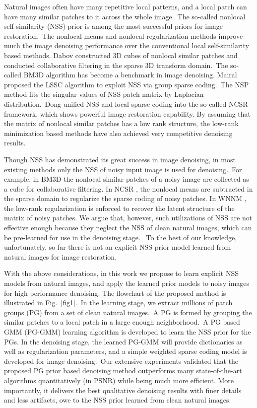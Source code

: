 Natural images often have many repetitive local patterns, and a local patch can have many similar patches to it across the whole image.\ The so-called nonlocal self-similarity (NSS) prior is among the most successful priors for image restoration.\ The nonlocal means \cite{nlm} and nonlocal regularization \cite{nlr} methods improve much the image denoising performance over the conventional local self-similarity based methods. Dabov \etal \cite{bm3d} constructed 3D cubes of nonlocal similar patches and conducted collaborative filtering in the sparse 3D transform domain.\ The so-called BM3D algorithm has become a benchmark in image denoising. Mairal \etal \cite{lssc} proposed the LSSC algorithm to exploit NSS via group sparse coding.\ The NSP \cite{nsp} method fits the singular values of NSS patch matrix by Laplacian distribution.\ Dong \etal \cite{ncsr} unified NSS and local sparse coding into the so-called NCSR framework, which shows powerful image restoration capability. By assuming that the matrix of nonlocal similar patches has a low rank structure, the low-rank minimization based methods \cite{nnm,wnnm} have also achieved very competitive denoising results. 

Though NSS has demonstrated its great success in image denoising, in most existing methods only the NSS of noisy input image is used for denoising.\ For example, in BM3D \cite{bm3d} the nonlocal similar patches of a noisy image are collected as a cube for collaborative filtering. In NCSR \cite{ncsr}, the nonlocal means are subtracted in the sparse domain to regularize the sparse coding of noisy patches. In WNNM \cite{wnnm}, the low-rank regularization is enforced to recover the latent structure of the matrix of noisy patches. We argue that, however, such utilizations of NSS are not effective enough because they neglect the NSS of clean natural images, which can be pre-learned for use in the denoising stage. \ To the best of our knowledge, unfortunately, so far there is not an explicit NSS prior model learned from natural images for image restoration. 

With the above considerations, in this work we propose to learn explicit NSS models from natural images, and apply the learned prior models to noisy images for high performance denoising. The flowchart of the proposed method is illustrated in Fig.\ \ref{fig1}.\ In the learning stage, we extract millions of patch groups (PG) from a set of clean natural images.\ A PG is formed by grouping the similar patches to a local patch in a large enough neighborhood.\ A PG based GMM (PG-GMM) learning algorithm is developed to learn the NSS prior for the PGs. In the denoising stage, the learned PG-GMM will provide dictionaries as well as regularization parameters, and a simple weighted sparse coding model is developed for image denoising.\ Our extensive experiments validated that the proposed PG prior based denoising method outperforms many state-of-the-art algorithms quantitatively (in PSNR) while being much more efficient. More importantly, it delivers the best qualitative denoising results with finer details and less artifacts, owe to the NSS prior learned from clean natural images.   
\vspace{-0.1in}
